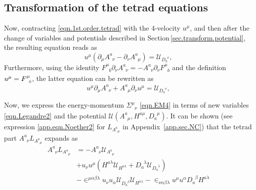 \documentclass[
10pt, %
a4paper, %
oneside, %
headinclude,footinclude, %
BCOR5mm, %
]{scrartcl}
\newcommand{\itetr}[2]{F^{#1}_{\phantom{#1}#2}}
\newcommand{\tetr}[2]{A^{#1}_{\phantom{#1}#2}}
\newcommand{\D}[1]{\partial_{#1}} %
\newcommand{\Tors}[2]{T^{#1}_{\phantom{a}#2}}
\newcommand{\eT}[2]{D_{#1}^{\phantom{#1}#2}}	%
\newcommand{\hT}[2]{H^{#1#2}}	%
\newcommand{\Laghodge}{L}%
\newcommand{\LagST}{\mathcal{U}}%
\newcommand{\EM}[2]{\Sigma^{#1}_{\phantom{#1}#2}}
\newcommand{\LCsymb}{\bm{\in}}    %
\newcommand{\indlat}[1]{\hat{\mathsmaller{#1}}}
\begin{document}
\subsection{Transformation of the tetrad equations}

%
%


Now, contracting \eqref{eqn.1st.order.tetrad} with the 4-velocity $ u^\mu $, and then after the 
change of variables and potentials described in Section\,\ref{sec.transform.potential}, the 
resulting equation reads as
\begin{equation}
	u^\mu(\D{\mu}\tetr{a}{\nu} - \D{\nu}\tetr{a}{\mu}) = \LagST_{\eT{a}{\nu}},
\end{equation}
Furthermore, using the identity $ \itetr{\mu}{b}\D{\nu}\tetr{a}{\nu} = - 
\tetr{a}{\nu}\D{\nu}\itetr{\mu}{b}$ and the definition $ u^\mu = \itetr{\mu}{\indlat{0}} 
$, the 
latter equation can be rewritten as
\begin{equation}
	u^\mu\D{\mu}\tetr{a}{\nu} + \tetr{a}{\mu}\D{\nu}u^\mu = \LagST_{\eT{a}{\nu}},
\end{equation}

Now, we express the energy-momentum $ \EM{\mu}{\nu} $ \eqref{eqn.EM4} in terms of new variables 
\eqref{eqn.Legandre2} and 
the potential $ \LagST(\tetr{a}{\mu},\hT{a}{\mu},\eT{a}{\mu}) $. It can be shown (see 
expression \eqref{app.eqn.Noether2} 
for $ \Laghodge_{\tetr{a}{\mu}} $ in 
Appendix~\ref{app.sec.NC}) that the tetrad part $ 
\tetr{a}{\nu}\Laghodge_{\tetr{a}{\mu}} $ expands as
\begin{align}
	\tetr{a}{\nu}\Laghodge_{\tetr{a}{\mu}} & =
    -\tetr{a}{\nu} \LagST_{\tetr{a}{\mu}} \nonumber\\
   & + u_\nu u^\mu(\hT{a}{\lambda} \LagST_{\hT{a}{\lambda}} + \eT{a}{\lambda} 
   \LagST_{\eT{a}{\lambda}}) 
   \nonumber\\
   &-\LCsymb^{\mu\alpha\beta\lambda} u_\nu u_\alpha \LagST_{\eT{a}{\beta}} \LagST_{\hT{a}{\lambda}}
   -\LCsymb_{\nu\alpha\beta\lambda} u^\mu u^\alpha \eT{a}{\beta}\hT{a}{\lambda}
\end{align}
\end{document}
